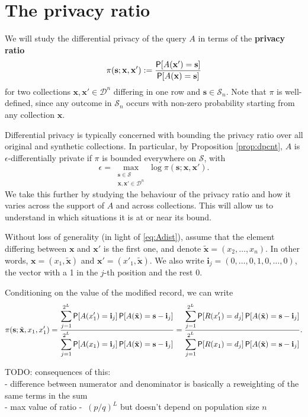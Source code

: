 \documentclass[11pt,draft]{article}
\newcommand{\Dsp}{\mathcal{D}}
\newcommand{\Ssp}{\mathcal{S}}
\newcommand{\xv}{\mathbf{x}}
\newcommand{\sv}{\mathbf{s}}
\newcommand{\xvt}{\tilde{\xv}}
\newcommand{\sm}{\sv^-}
\newcommand{\iv}{\mathbf{i}}
\begin{document}
\section{The privacy ratio}

We will study the differential privacy of the query $A$ in terms of the \textbf{privacy ratio}
\[ \pi(\sv;\xv,\xv') := \frac{\P[A(\xv') = \sv]}{\P[A(\xv) = \sv]} \]
for two collections $\xv,\xv'\in\Dsp^n$ differing in one row and $\sv \in\Ssp_n$.
Note that $\pi$ is well-defined, since any outcome in $\Ssp_n$ occurs with non-zero probability starting from any collection $\xv$.

Differential privacy is typically concerned with bounding the privacy ratio over all original and synthetic collections.
In particular, by Proposition \ref{prop:dpcnt}, $A$ is $\epsilon$-differentially private if $\pi$ is bounded everywhere on $\Ssp$,
with
\[ \epsilon = \max_{\substack{\sv\in\Ssp\\ \xv,\xv' \in \Dsp^n}} \log\pi(\sv;\xv,\xv'). \]
We take this further by studying the behaviour of the privacy ratio and how it varies across the support of $A$ and across collections. This will allow us to understand in which situations it is at or near its bound.

Without loss of generality (in light of \eqref{eq:Adist}), assume that the element differing between $\xv$ and $\xv'$ is the first one, and denote $\xvt = (x_2,\dots,x_n)$.
In other words, $\xv = (x_1,\xvt)$ and $\xv' = (x'_1, \xvt)$.
We also write $\iv_j = (0,\dots,0,1,0,\dots,0)$, the vector with a 1 in the $j$-th position and the rest 0.

Conditioning on the value of the modified record, we can write
\begin{equation} \label{eq:prcond}
\pi(\sv;\xvt,x_1,x_1') = \frac{\displaystyle\sum_{j=1}^{2^L}
\P[A(x'_1) = \iv_j] \P[A(\xvt) = \sv - \iv_j]}
{\displaystyle\sum_{j=1}^{2^L}
\P[A(x_1) = \iv_j] \P[A(\xvt) = \sv - \iv_j]}
= \frac{\displaystyle\sum_{j=1}^{2^L}
\P[R(x'_1) = d_j] \P[A(\xvt) = \sv - \iv_j]}
{\displaystyle\sum_{j=1}^{2^L}
\P[R(x_1) = d_j] \P[A(\xvt) = \sv - \iv_j]}.
\end{equation}

TODO: consequences of this: \\
- difference between numerator and denominator is basically a reweighting of the same terms in the sum \\
- max value of ratio -  $~ (p/q)^L$ but doesn't depend on population size $n$
\end{document}
